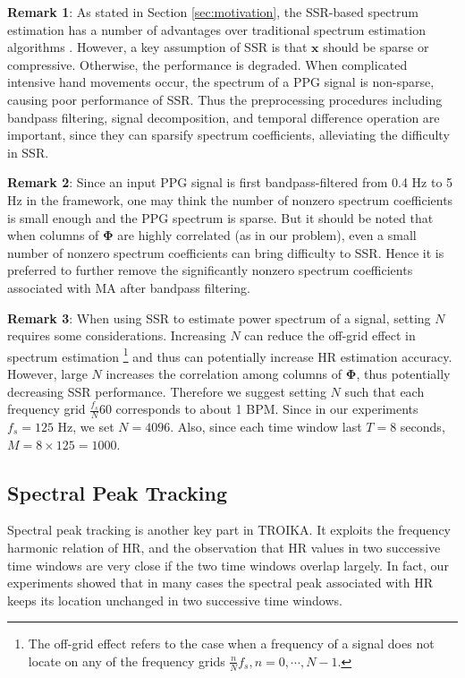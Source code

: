 \documentclass[10pt,twocolumn]{IEEEtran}
\begin{document}
\textbf{Remark 1}: As stated in Section \ref{sec:motivation}, the SSR-based spectrum estimation has a number of advantages over traditional  spectrum estimation algorithms \cite{Gorodnitsky1997,duarte2013spectral}. However, a key assumption of SSR is that $\mathbf{x}$ should be sparse or compressive. Otherwise, the performance is degraded. When complicated intensive hand movements occur, the spectrum of a PPG signal is non-sparse, causing poor performance of SSR. Thus the preprocessing procedures including bandpass filtering, signal decomposition, and temporal difference operation are important, since they can sparsify spectrum coefficients, alleviating the difficulty in SSR.


\textbf{Remark 2}: Since an input PPG signal is first bandpass-filtered from 0.4 Hz to 5 Hz in the framework, one may think the number of nonzero spectrum coefficients is small enough and the PPG spectrum is  sparse. But it should be noted that when columns of $\mathbf{\Phi}$ are highly correlated (as in our problem), even a small number of nonzero spectrum coefficients can bring difficulty to SSR. Hence it is preferred to further remove the significantly nonzero spectrum coefficients associated with MA after bandpass filtering.


\textbf{Remark 3}: When using SSR to estimate power spectrum of a signal, setting $N$ requires some considerations. Increasing $N$ can reduce the off-grid effect in spectrum estimation \footnote{The off-grid effect refers to the case when a frequency of a signal does not locate on any of the frequency grids $\frac{n}{N}f_s, n=0,\cdots,N-1$.} and thus can potentially increase HR estimation accuracy. However, large $N$ increases the correlation among columns of $\mathbf{\Phi}$, thus potentially decreasing SSR performance. Therefore we suggest  setting $N$ such that each frequency grid $\frac{f_s}{N}60$ corresponds to about 1 BPM. Since in our experiments $f_s=125$ Hz, we set $N=4096$. Also, since each time window last $T=8$ seconds, $M=8\times 125=1000$.





\subsection{Spectral Peak Tracking}

Spectral peak tracking is another key part in TROIKA. It exploits the frequency harmonic relation of HR, and the observation that HR values in two successive time windows are very close if the two time windows overlap largely. In fact,  our experiments showed that in many cases the spectral peak associated with HR keeps its location unchanged in two successive time windows.
\end{document}

